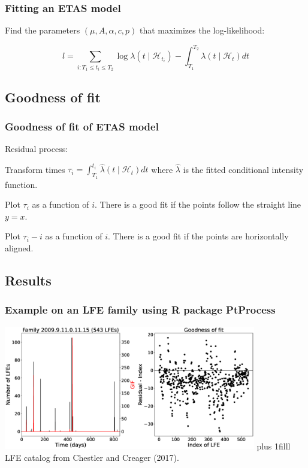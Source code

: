 \documentclass{beamer}
\newcommand{\btVFill}{\vskip0pt plus 1filll}
\begin{document}
	\begin{frame}
		\frametitle{Fitting an ETAS model}
		Find the parameters $\left( \mu , A , \alpha , c , p \right)$ that maximizes the log-likelihood:

		\begin{equation*}
		l = \sum_{i : T_1 \leq t_i \leq T_2} \log \lambda \left( t \mid \mathcal{H}_{t_i} \right) - \int_{T_1}^{T_2} \lambda \left( t \mid \mathcal{H}_t \right) dt
    		\end{equation*}
	\end{frame}

	\subsection{Goodness of fit}

	\begin{frame}
		\frametitle{Goodness of fit of ETAS model}
		Residual process:

		\vspace{1em}

		Transform times $\tau_i = \int_{T_1}^{t_i} \hat{\lambda} \left( t \mid \mathcal{H}_t \right) dt$ where $\hat{\lambda}$ is the fitted conditional intensity function.

		\vspace{2em}

		Plot $\tau_i$ as a function of $i$. There is a good fit if the points follow the straight line $y = x$.

		\vspace{1em}

		Plot $\tau_i - i$ as a function of $i$. There is a good fit if the points are horizontally aligned.
	\end{frame}

	\subsection{Results}

	\begin{frame}
		\frametitle{Example on an LFE family using R package PtProcess}
		\vspace{1em}
		\includegraphics[trim={0cm 0cm 0cm 0cm}, clip, width=11cm]{gif_residuals_PtProcess.eps}
		\btVFill
		\tiny{LFE catalog from Chestler and Creager (2017).}
	\end{frame}
\end{document}
